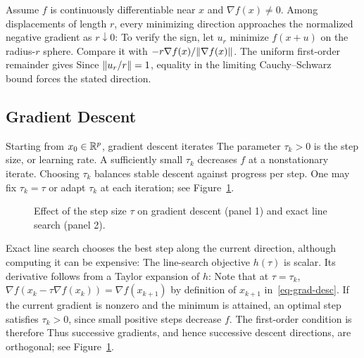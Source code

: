 \begin{rem}
	Assume $f$ is continuously differentiable near $x$ and $\nabla f(x)\neq0$. Among displacements of length $r$, every minimizing direction approaches the normalized negative gradient as $r\downarrow0$:
To verify the sign, let $u_r$ minimize $f(x+u)$ on the radius-$r$ sphere. Compare it with $-r\nabla f(x)/\lVert\nabla f(x)\rVert$. The uniform first-order remainder gives
Since $\lVert u_r/r\rVert=1$, equality in the limiting Cauchy--Schwarz bound forces the stated direction.
\end{rem}


\subsection{Gradient Descent}

Starting from $x_0 \in \mathbb{R}^p$, gradient descent iterates
The parameter $\tau_k>0$ is the step size, or learning rate. A sufficiently small $\tau_k$ decreases $f$ at a nonstationary iterate. Choosing $\tau_k$ balances stable descent against progress per step.
%
One may fix $\tau_k=\tau$ or adapt $\tau_k$ at each iteration; see Figure~\ref{fig-gradesc}.


\begin{figure}[tbp]
\centering
{}\hfill
{}
\caption{Effect of the step size $\tau$ on gradient descent (panel 1) and exact line search (panel 2).}
\label{fig-gradesc}
\end{figure}


\begin{rem}
Exact line search chooses the best step along the current direction, although computing it can be expensive:
The line-search objective $h(\tau)$ is scalar. Its derivative follows from a Taylor expansion of $h$:
Note that at $\tau=\tau_k$, $\nabla f(x_k-\tau \nabla f(x_k))=\nabla f(x_{k+1})$ by definition of $x_{k+1}$ in~\eqref{eq-grad-desc}.
%
If the current gradient is nonzero and the minimum is attained, an optimal step satisfies $\tau_k>0$, since small positive steps decrease $f$. The first-order condition is therefore
Thus successive gradients, and hence successive descent directions, are orthogonal; see Figure~\ref{fig-gradesc}.
\end{rem}

